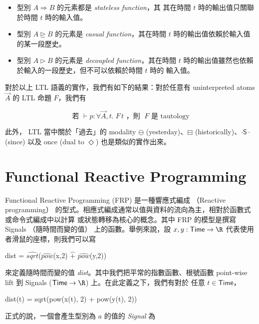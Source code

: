 \documentclass{article}
\newcommand{\Time}{\mathsf{Time}}
\begin{document}
  \begin{itemize}
    \item 型別 $A\Rightarrow B$ 的元素都是 \emph{stateless function}，其
    其在時間 $t$ 時的輸出值只關聯於時間 $t$ 時的輸入值。

    \item 型別 $A\unrhd B$ 的元素是 \emph{casual function}，其在時間 $t$
    時的輸出值依賴於輸入值的某一段歷史。

    \item 型別 $A\rhd B$ 的元素是 \emph{decoupled function}，其在時間 $t$
    時的輸出值雖然也依賴於輸入的一段歷史，但不可以依賴於時間 $t$ 時的
    輸入值。
  \end{itemize}

  對於以上 LTL 語義的實作，我們有如下的結果：對於任意有 uninterpreted atoms
  $\overrightarrow{A}$ 的 LTL 命題 $F$，我們有

  \[ \text{若 } \vdash p:\forall{\overrightarrow{A}},t.\; F\,t \text{ ，則 } \;F \text{ 是 tautology}\]

  此外， LTL 當中關於「過去」的 modality $\ominus$ (yesterday)、$\boxminus$
  (historically)、$\cdot\mathsf{S}\cdot$ (since) 以及 once (dual to $\Diamond$)
  也是類似的實作出來。

\section{Functional Reactive Programming}
  Functional Reactive Programming (FRP) 是一種響應式編成
  （Reactive programming）
  的型式。相應式編成通常以值與資料的流向為主，相對於函數式或命令式編成中以計算
  或狀態轉移為核心的概念。其中 FRP 的模型是撰寫 Signals （隨時間而變的值）
  上的函數。舉例來說，設 $x,y:\Time\to\R$ 代表使用者滑鼠的座標，則我們可以寫

  \begin{code}
  dist = $\widehat{\mathit{sqrt}}$($\widehat{\mathit{pow}}$(x,2) $\widehat{+}$ $\widehat{\mathit{pow}}$(y,2))
  \end{code}

  來定義隨時間而變的值 \textit{dist}。其中我們把平常的指數函數、根號函數
  point-wise lift 到 Signals ($\Time\to\R$) 上。在此定義之下，我們有對於
  任意 $t\in\Time$，

  \begin{code}
  dist(t) = sqrt(pow(x(t), 2) + pow(y(t), 2))
  \end{code}

  正式的說，一個會產生型別為 $a$ 的值的 \emph{Signal} 為
\end{document}
